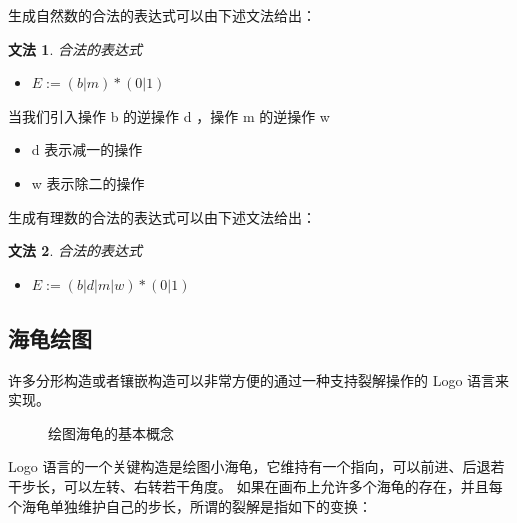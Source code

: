 \documentclass[a4paper,12pt]{article}
\newtheorem{grammar}{文法}
\begin{document}
生成自然数的合法的表达式可以由下述文法给出：

\begin{grammar}
\label{g1}
合法的表达式
\begin{itemize}
\item $E := (b | m)* (0 | 1)$
\end{itemize}
\end{grammar}

当我们引入操作 b 的逆操作 d ，操作 m 的逆操作 w

\begin{itemize}
\item d 表示减一的操作
\item w 表示除二的操作
\end{itemize}

生成有理数的合法的表达式可以由下述文法给出：

\begin{grammar}
\label{g1}
合法的表达式
\begin{itemize}
\item $E := (b | d | m | w)* (0 | 1)$
\end{itemize}
\end{grammar}

\newpage

\subsection{海龟绘图}

许多分形构造或者镶嵌构造可以非常方便的通过一种支持裂解操作的 Logo 语言来实现。

\begin{figure}[ht]
\centering
{}
\caption{绘图海龟的基本概念}
\end{figure}

Logo 语言的一个关键构造是绘图小海龟，它维持有一个指向，可以前进、后退若干步长，可以左转、右转若干角度。
如果在画布上允许多个海龟的存在，并且每个海龟单独维护自己的步长，所谓的裂解是指如下的变换：

\newpage
\end{document}
